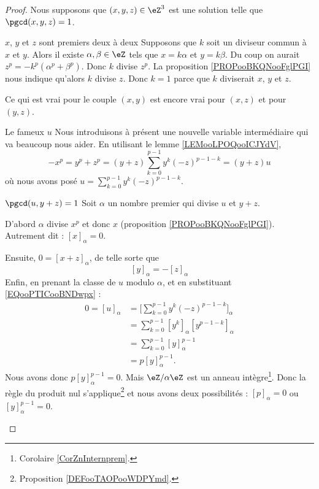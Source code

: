 \begin{proof}
	Nous supposons que \( (x,y,z)\in \eZ^3\) est une solution telle que \( \pgcd(x,y,z)=1\).
	\begin{subproof}
		\item[\( x\), \( y\) et \( z\) sont premiers deux à deux]
		Supposons que \( k\) soit un diviseur commun à \( x\) et \( y\). Alors il existe \( \alpha,\beta\in \eZ\) tels que \( x=k\alpha\) et \( y=k\beta\). Du coup on aurait \( z^p=-k^p(\alpha^p+\beta^p)\). Donc \( k\) divise \( z^p\). La proposition \ref{PROPooBKQNooFglPGI} nous indique qu'alors \( k\) divise \( z\). Donc \( k=1\) parce que \( k\) diviserait \( x\), \( y\) et \( z\).

		Ce qui est vrai pour le couple \( (x,y)\) est encore vrai pour \( (x,z)\) et pour \( (y,z)\).

		\item[Le fameux \( u\)]
		Nous introduisons à présent une nouvelle variable intermédiaire qui va beaucoup nous aider. En utilisant le lemme \ref{LEMooLPOQooICJYdV},
		\begin{equation}
			-x^p=y^p+z^p=(y+z)\sum_{k=0}^{p-1}y^k(-z)^{p-1-k}=(y+z)u
		\end{equation}
		où nous avons posé \( u=\sum_{k=0}^{p-1}y^k(-z)^{p-1-k}\).

		\item[\( \pgcd(u,y+z)=1\)]
		Soit \( \alpha\) un nombre premier qui divise \( u\) et \( y+z\).

		D'abord \( \alpha\) divise \( x^p\) et donc \( x\) (proposition \ref{PROPooBKQNooFglPGI}). Autrement dit : \( [x]_{\alpha}=0\).

		Ensuite, \( 0=[x+z]_{\alpha}\), de telle sorte que
		\begin{equation}        \label{EQooPTICooBNDwpx}
			[y]_{\alpha}=-[z]_{\alpha}
		\end{equation}
		Enfin, en prenant la classe de \( u\) modulo \( \alpha\), et en substituant \eqref{EQooPTICooBNDwpx} :
		\begin{subequations}
			\begin{align}
				0=[u]_{\alpha} & =\big[ \sum_{k=0}^{p-1}y^k(-z)^{p-1-k} \big]_{\alpha} \\
				               & =\sum_{k=0}^{p-1}[y^k]_{\alpha}[y^{p-1-k}]_{\alpha}   \\
				               & =\sum_{k=0}^{p-1}[y]^{p-1}_{\alpha}                   \\
				               & =p[y]_{\alpha}^{p-1}.
			\end{align}
		\end{subequations}
		Nous avons donc \( p[y]_{\alpha}^{p-1}=0\). Mais \(  \eZ/\alpha\eZ\) est un anneau intègre\footnote{Corolaire \ref{CorZnInternprem}.}. Donc la règle du produit nul s'applique\footnote{Proposition \ref{DEFooTAOPooWDPYmd}.} et nous avons deux possibilités : \( [p]_{\alpha}=0\) ou \( [y]_{\alpha}^{p-1}=0\).


\end{subproof}
\end{proof}
